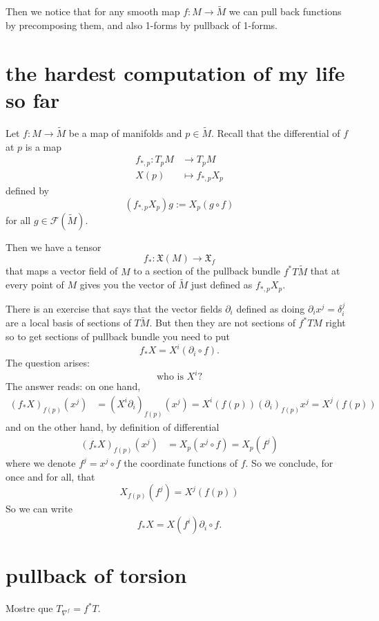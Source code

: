 Then we notice that for any smooth map \(f:M \to \widetilde{M}\) we can pull back functions by precomposing them, and also 1-forms by pullback of 1-forms.

\section{the hardest computation of my life so far}
Let \(f:M \to \tilde{M}\) be a map of manifolds and \(p \in \tilde{M}\).  Recall that the differential of \(f\) at \(p\) is a map
\begin{align*}
	f_{*,p}: T_pM &\longrightarrow T_pM \\
	X(p) &\longmapsto f_{*,p}X_p
\end{align*}
defined by
\[(f_{*,p}X_p)g:=X_p(g \circ f)\]
for all \(g \in \mathcal{F}(\tilde{M})\).

Then we have a tensor
\[f_*:\mathfrak{X}(M) \longrightarrow \mathfrak{X}_f\]
that maps a vector field of \(M\) to a section of the pullback bundle \(f^*T\tilde{M}\) that at every point  of \(M\) gives you the vector of \(\tilde{M}\) just defined as \(f_{*,p}X_p\).

There is an exercise that says that the vector fields \(\partial_i\) defined as doing \(\partial_i x^j=\delta_i^j\) are a local basis of sections of \(T\tilde{M}\). But then they are not sections of \(f^*TM\) right so to get sections of pullback bundle you need to put
\[f_* X=X^i(\partial_i \circ f).\]
The question arises:
\[\text{who is } X^i\text{?} \]
The answer reads: on one hand,
\begin{align*}
	(f_*X)_{f(p)}(x^j)&=(X^i \partial_i)_{f(p)}(x^j)=X^i(f(p))(\partial_i)_{f(p)}x^j=X^j(f(p))
\end{align*}
and on the other hand, by definition of differential
\begin{align*}
	(f_*X)_{f(p)}(x^j)&=X_p(x^j\circ f)=X_p(f^j)
\end{align*}
where we denote \(f^j=x^j \circ f\) the coordinate functions of \(f\). So we conclude, for once and for all, that
\[X_{f(p)}(f^j)=X^j(f(p))\]
So we can write
\[f_*X=X(f^i)\partial_i \circ f .\]

\section{pullback of torsion}

\begin{exercise}\leavevmode
Mostre que \(T_{\nabla^f}=f^*T\).
\end{exercise}

